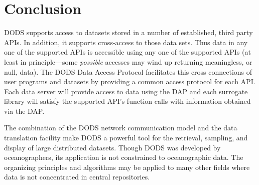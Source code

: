 \section{Conclusion}

DODS supports access to datasets stored in a number of established,
third party APIs. In addition, it supports cross-access to those data
sets. Thus data in any one of the supported APIs is accessible using
any one of the supported APIs (at least in principle---some {\em
possible\/} accesses may wind up returning meaningless, or null,
data). The DODS Data Access Protocol facilitates this cross
connections of user programs and datasets by providing a common
access protocol for each API\@. Each data server will provide access
to data using the DAP and each surrogate library will satisfy the
supported API's function calls with information obtained via the
DAP\@.

The combination of the DODS network communication model and the data
translation facility make DODS a powerful tool for the retrieval,
sampling, and display of large distributed datasets.  Though DODS was
developed by oceanographers, its application is not constrained to
oceanographic data. The organizing principles and algorithms may be
applied to many other fields where data is not concentrated in central
repositories.

\clearpage








